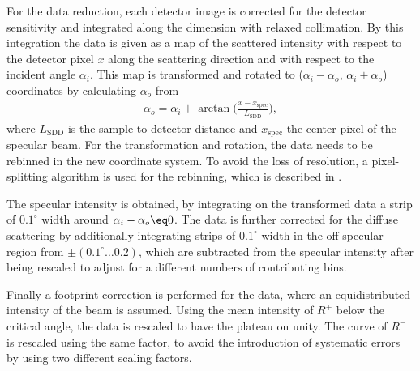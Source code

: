 \documentclass[\main/dresen_thesis.tex]{subfiles}
\begin{document}
    For the data reduction, each detector image is corrected for the detector sensitivity and integrated along the dimension with relaxed collimation.
    By this integration the data is given as a map of the scattered intensity with respect to the detector pixel $x$ along the scattering direction and with respect to the incident angle $\alpha_i$.
    This map is transformed and rotated to ($\alpha_i - \alpha_o$, $\alpha_i+\alpha_o$) coordinates by calculating $\alpha_o$ from
    \begin{align}
      \alpha_o = \alpha_i + \arctan \biggl( \frac{x - x_\mathrm{spec}}{L_\mathrm{SDD}} \biggr),
    \end{align}
    where $L_\mathrm{SDD}$ is the sample-to-detector distance and $x_\mathrm{spec}$ the center pixel of the specular beam.
    For the transformation and rotation, the data needs to be rebinned in the new coordinate system.
    To avoid the loss of resolution, a pixel-splitting algorithm is used for the rebinning, which is described in .

    The specular intensity is obtained, by integrating on the transformed data a strip of $0.1 ^\circ$ width around $\alpha_i - \alpha_o \eq 0$.
    The data is further corrected for the diffuse scattering by additionally integrating strips of $0.1 ^\circ$ width in the off-specular region from $\pm (0.1 ^\circ \ldots 0.2)$, which are subtracted from the specular intensity after being rescaled to adjust for a different numbers of contributing bins.

    Finally a footprint correction is performed for the data, where an equidistributed intensity of the beam is assumed.
    Using the mean intensity of $R^{+}$ below the critical angle, the data is rescaled to have the plateau on unity.
    The curve of $R^{-}$ is rescaled using the same factor, to avoid the introduction of systematic errors by using two different scaling factors.
\end{document}

